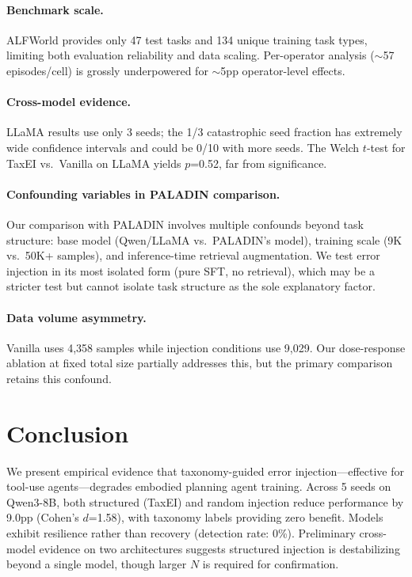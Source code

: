 \documentclass[11pt]{article}
\begin{document}
\paragraph{Benchmark scale.}
ALFWorld provides only 47 test tasks and 134 unique training task types, limiting both evaluation reliability and data scaling.
Per-operator analysis ($\sim$57 episodes/cell) is grossly underpowered for $\sim$5pp operator-level effects.

\paragraph{Cross-model evidence.}
LLaMA results use only 3 seeds; the 1/3 catastrophic seed fraction has extremely wide confidence intervals and could be 0/10 with more seeds.
The Welch $t$-test for TaxEI vs.\ Vanilla on LLaMA yields $p$=0.52, far from significance.

\paragraph{Confounding variables in PALADIN comparison.}
Our comparison with PALADIN involves multiple confounds beyond task structure: base model (Qwen/LLaMA vs.\ PALADIN's model), training scale (9K vs.\ 50K+ samples), and inference-time retrieval augmentation.
We test error injection in its most isolated form (pure SFT, no retrieval), which may be a stricter test but cannot isolate task structure as the sole explanatory factor.

\paragraph{Data volume asymmetry.}
Vanilla uses 4,358 samples while injection conditions use 9,029.
Our dose-response ablation at fixed total size partially addresses this, but the primary comparison retains this confound.

\section{Conclusion}

We present empirical evidence that taxonomy-guided error injection---effective for tool-use agents---degrades embodied planning agent training.
Across 5 seeds on Qwen3-8B, both structured (TaxEI) and random injection reduce performance by 9.0pp (Cohen's $d$=1.58), with taxonomy labels providing zero benefit.
Models exhibit resilience rather than recovery (detection rate: 0\%).
Preliminary cross-model evidence on two architectures suggests structured injection is destabilizing beyond a single model, though larger $N$ is required for confirmation.
\end{document}
